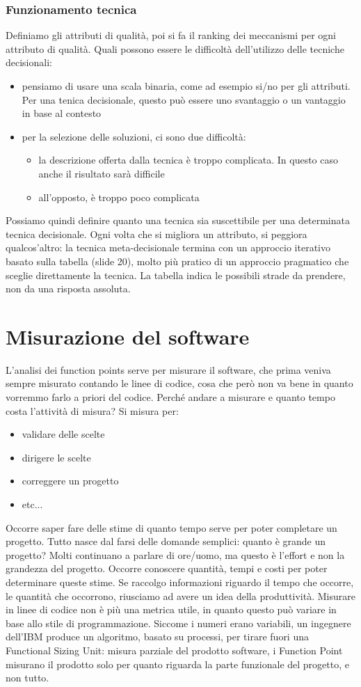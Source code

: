 \documentclass{article}
\begin{document}
\subsubsection{Funzionamento tecnica}
Definiamo gli attributi di qualità, poi si fa il ranking dei meccanismi per ogni attributo di qualità. Quali possono essere le difficoltà dell'utilizzo delle tecniche decisionali:
\begin{itemize}
\item pensiamo di usare una scala binaria, come ad esempio si/no per gli attributi. Per una tenica decisionale, questo può essere uno svantaggio o un vantaggio in base al contesto
\item per la selezione delle soluzioni, ci sono due difficoltà:
\begin{itemize}
\item la descrizione offerta dalla tecnica è troppo complicata. In questo caso anche il risultato sarà difficile
\item all'opposto, è troppo poco complicata
\end{itemize}
\end{itemize}
Possiamo quindi definire quanto una tecnica sia suscettibile per una determinata tecnica decisionale. Ogni volta che si migliora un attributo, si peggiora qualcos'altro: la tecnica meta-decisionale termina con un approccio iterativo basato sulla tabella (slide 20), molto più pratico di un approccio pragmatico che sceglie direttamente la tecnica. La tabella indica le possibili strade da prendere, non da una risposta assoluta.

\newpage
\section{Misurazione del software}
L'analisi dei function points serve per misurare il software, che prima veniva sempre misurato contando le linee di codice, cosa che però non va bene in quanto vorremmo farlo a priori del codice. Perché andare a misurare e quanto tempo costa l'attività di misura? Si misura per:
\begin{itemize}
\item validare delle scelte
\item dirigere le scelte
\item correggere un progetto
\item etc...
\end{itemize}
Occorre saper fare delle stime di quanto tempo serve per poter completare un progetto. Tutto nasce dal farsi delle domande semplici: quanto è grande un progetto? Molti continuano a parlare di ore/uomo, ma questo è l'effort e non la grandezza del progetto. Occorre conoscere quantità, tempi e costi per poter determinare queste stime. Se raccolgo informazioni riguardo il tempo che occorre, le quantità che occorrono, riusciamo ad avere un idea della produttività. Misurare in linee di codice non è più una metrica utile, in quanto questo può variare in base allo stile di programmazione. Siccome i numeri erano variabili, un ingegnere dell'IBM produce un algoritmo, basato su processi, per tirare fuori una Functional Sizing Unit: misura parziale del prodotto software, i Function Point misurano il prodotto solo per quanto riguarda la parte funzionale del progetto, e non tutto.
\end{document}
